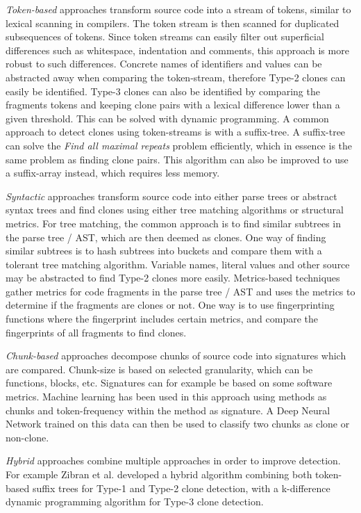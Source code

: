 \documentclass[12pt]{article}
\begin{document}
\textit{Token-based} approaches transform source code into a stream of tokens, similar to
lexical scanning in compilers. The token stream is then scanned for duplicated
subsequences of tokens. Since token streams can easily filter out superficial differences
such as whitespace, indentation and comments, this approach is more robust to such
differences. Concrete names of identifiers and values can be abstracted away when comparing
the token-stream, therefore Type-2 clones can easily be identified. Type-3 clones can also
be identified by comparing the fragments tokens and keeping clone pairs with a lexical
difference lower than a given threshold. This can be solved with dynamic
programming\cite{BakerSparseDynamicProgramming}. A common approach to detect clones using
token-streams is with a suffix-tree. A suffix-tree can solve the \textit{Find all maximal
	repeats} problem efficiently, which in essence is the same problem as finding clone pairs.
This algorithm can also be improved to use a suffix-array instead, which requires less
memory.

\textit{Syntactic} approaches transform source code into either parse trees or abstract
syntax trees and find clones using either tree matching algorithms or structural metrics.
For tree matching, the common approach is to find similar subtrees in the parse tree /
AST, which are then deemed as clones. One way of finding similar subtrees is to hash
subtrees into buckets and compare them with a tolerant tree matching algorithm. Variable
names, literal values and other source may be abstracted to find Type-2 clones more
easily. Metrics-based techniques gather metrics for code fragments in the parse tree / AST
and uses the metrics to determine if the fragments are clones or not. One way is to use
fingerprinting functions where the fingerprint includes certain metrics, and compare the
fingerprints of all fragments to find clones.

\textit{Chunk-based} approaches decompose chunks of source code into signatures which are
compared. Chunk-size is based on selected granularity, which can be functions, blocks,
etc. Signatures can for example be based on some software metrics. Machine learning has
been used in this approach using methods as chunks and token-frequency within the method
as signature. A Deep Neural Network trained on this data can then be used to classify two
chunks as clone or non-clone.

\textit{Hybrid} approaches combine multiple approaches in order to improve detection. For
example Zibran et al.\cite{Zibran_real_time_search} developed a hybrid algorithm
combining both token-based suffix trees for Type-1 and Type-2 clone detection, with
a k-difference dynamic programming algorithm for Type-3 clone detection.
\end{document}
